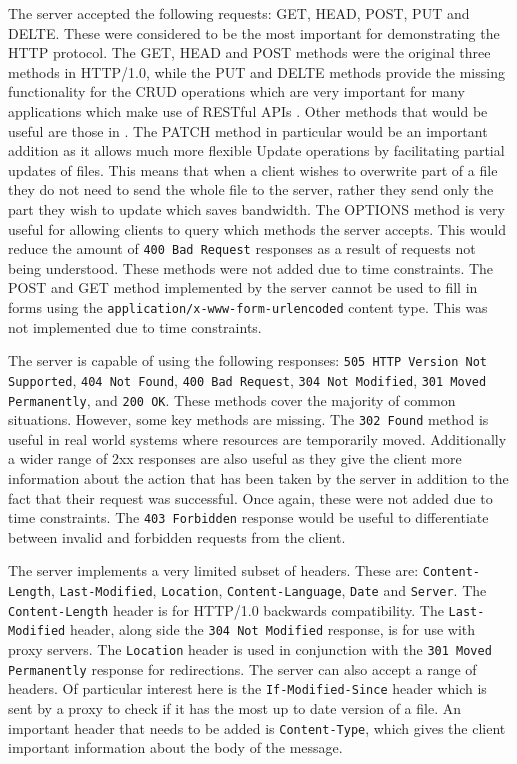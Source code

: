 \documentclass[10pt,twocolumn]{witseiepaper}
\begin{document}
	The server accepted the following requests: GET, HEAD, POST, PUT and DELTE. These were considered to be the most important for demonstrating the HTTP protocol. The GET, HEAD and POST methods were the original three methods in HTTP/1.0, while the PUT and DELTE methods provide the missing functionality for the CRUD operations which are very important for many applications which make use of RESTful APIs \cite{guinard}. Other methods that would be useful are those in . The PATCH method in particular would be an important addition as it allows much more flexible Update operations by facilitating partial updates of files. This means that when a client wishes to overwrite part of a file they do not need to send the whole file to the server, rather they send only the part they wish to update which saves bandwidth. The OPTIONS method is very useful for allowing clients to query which methods the server accepts. This would reduce the amount of \texttt{400 Bad Request} responses as a result of requests not being understood. These methods were not added due to time constraints. The POST and GET method implemented by the server cannot be used to fill in forms using the \texttt{application/x-www-form-urlencoded} content type. This was not implemented due to time constraints.

	The server is capable of using the following responses: \texttt{505 HTTP Version Not Supported}, \texttt{404 Not Found}, \texttt{400 Bad Request}, \texttt{304 Not Modified}, \texttt{301 Moved Permanently}, and \texttt{200 OK}. These methods cover the majority of common situations. However, some key methods are missing. The \texttt{302 Found} method is useful in real world systems where resources are temporarily moved. Additionally a wider range of 2xx responses are also useful as they give the client more information about the action that has been taken by the server in addition to the fact that their request was successful. Once again, these were not added due to time constraints. The \texttt{403 Forbidden} response would be useful to differentiate between invalid and forbidden requests from the client.

	The server implements a very limited subset of headers. These are: \texttt{Content-Length}, \texttt{Last-Modified}, \texttt{Location}, \texttt{Content-Language}, \texttt{Date} and \texttt{Server}. The \texttt{Content-Length} header is for HTTP/1.0 backwards compatibility. The \texttt{Last-Modified} header, along side the \texttt{304 Not Modified} response, is for use with proxy servers. The \texttt{Location} header is used in conjunction with the \texttt{301 Moved Permanently} response for redirections. The server can also accept a range of headers. Of particular interest here is the \texttt{If-Modified-Since} header which is sent by a proxy to check if it has the most up to date version of a file. An important header that needs to be added is \texttt{Content-Type}, which gives the client important information about the body of the message. 
\end{document}

